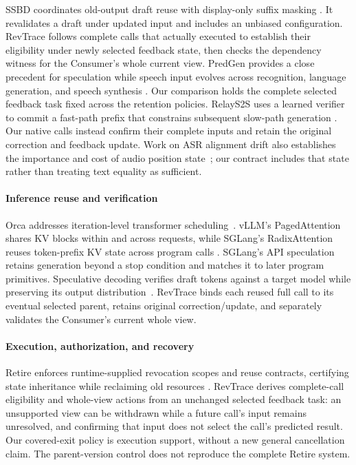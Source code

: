 SSBD coordinates old-output draft reuse with display-only suffix masking
\cite{zeng2026ssbd}. It revalidates a draft under updated input and includes
an unbiased configuration. RevTrace follows complete calls that actually
executed to establish their eligibility under newly selected feedback state,
then checks the dependency witness for the Consumer's whole current view.
PredGen provides a close precedent for speculation while speech input
evolves across recognition, language generation, and speech synthesis
\cite{li2025predgen}. Our comparison holds the complete selected feedback
task fixed across the retention policies. RelayS2S uses a learned verifier to commit a fast-path
prefix that constrains subsequent slow-path generation
\cite{mai2026relays2s}. Our native calls instead confirm their complete
inputs and retain the original correction and feedback update. Work on
ASR alignment drift also establishes the importance and cost of audio
position state~\cite{wang2026alignmentdrift}; our contract includes that
state rather than treating text equality as sufficient.

\paragraph{Inference reuse and verification}
Orca addresses iteration-level transformer scheduling~\cite{yu2022orca}.
vLLM's PagedAttention shares KV blocks within and across requests, while
SGLang's RadixAttention reuses token-prefix KV state across program calls
\cite{kwon2023pagedattention,zheng2024sglang}. SGLang's API speculation
retains generation beyond a stop condition and matches it to later
program primitives.
Speculative decoding verifies draft tokens against a target model while
preserving its output distribution~\cite{leviathan2023speculative}.
RevTrace binds each reused full call to its eventual selected parent,
retains original correction/update, and separately validates the
Consumer's current whole view.

\paragraph{Execution, authorization, and recovery}
Retire enforces runtime-supplied revocation scopes and reuse contracts,
certifying state inheritance while reclaiming old resources
\cite{zhang2026retire}.
RevTrace derives complete-call eligibility and whole-view actions from
an unchanged selected feedback task: an unsupported view can be withdrawn
while a future call's input remains unresolved, and confirming that input
does not select the call's predicted result. Our covered-exit policy
is execution support, without a new general cancellation claim. The
parent-version control does not reproduce the complete Retire system.

